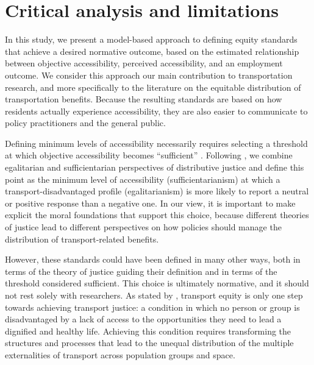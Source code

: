 \documentclass[preprint, 3p,
authoryear]{elsarticle} %
\begin{document}
\section{Critical analysis and
limitations}\label{critical-analysis-and-limitations}

In this study, we present a model-based approach to defining equity
standards that achieve a desired normative outcome, based on the
estimated relationship between objective accessibility, perceived
accessibility, and an employment outcome. We consider this approach our
main contribution to transportation research, and more specifically to
the literature on the equitable distribution of transportation benefits.
Because the resulting standards are based on how residents actually
experience accessibility, they are also easier to communicate to policy
practitioners and the general public.

Defining minimum levels of accessibility necessarily requires selecting
a threshold at which objective accessibility becomes ``sufficient''
\citep{martens2016}. Following \citet{pereira2021}, we combine
egalitarian and sufficientarian perspectives of distributive justice and
define this point as the minimum level of accessibility
(sufficientarianism) at which a transport-disadvantaged profile
(egalitarianism) is more likely to report a neutral or positive response
than a negative one. In our view, it is important to make explicit the
moral foundations that support this choice, because different theories
of justice lead to different perspectives on how policies should manage
the distribution of transport-related benefits.

However, these standards could have been defined in many other ways,
both in terms of the theory of justice guiding their definition and in
terms of the threshold considered sufficient. This choice is ultimately
normative, and it should not rest solely with researchers. As stated by
\citet{karner2020}, transport equity is only one step towards achieving
transport justice: a condition in which no person or group is
disadvantaged by a lack of access to the opportunities they need to lead
a dignified and healthy life. Achieving this condition requires
transforming the structures and processes that lead to the unequal
distribution of the multiple externalities of transport across
population groups and space.
\end{document}
